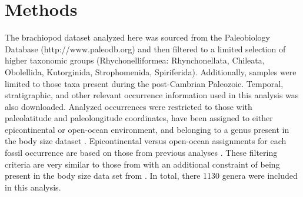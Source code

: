 \documentclass[11pt]{article}
\begin{document}




\section*{Methods}

The brachiopod dataset analyzed here was sourced from the Paleobiology Database (http://www.paleodb.org) and then filtered to a limited selection of higher taxonomic groups (Rhychonelliformea: Rhynchonellata, Chileata, Obolellida, Kutorginida, Strophomenida, Spiriferida). Additionally, samples were limited to those taxa present during the post-Cambrian Paleozoic. Temporal, stratigraphic, and other relevant occurrence information used in this analysis was also downloaded. Analyzed occurrences were restricted to those with paleolatitude and paleolongitude coordinates, have been assigned to either epicontinental or open-ocean environment, and belonging to a genus present in the body size dataset \citep{Payne2014}. Epicontinental versus open-ocean assignments for each fossil occurrence are based on those from previous analyses \citet{Miller2009a,Foote2013,Ritterbush2017}. These filtering criteria are very similar to those from \citet{Foote2013} with an additional constraint of being present in the body size data set from \citet{Payne2014}. In total, there 1130 genera were included in this analysis.
\end{document}
